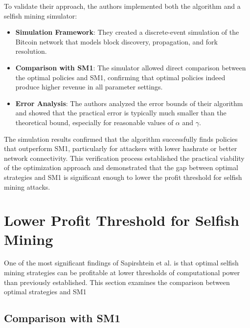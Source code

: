 \documentclass[conference]{IEEEtran}
\begin{document}
To validate their approach, the authors implemented both the algorithm and a selfish mining simulator:

\begin{itemize}
    \item \textbf{Simulation Framework}: They created a discrete-event simulation of the Bitcoin network that models block discovery, propagation, and fork resolution.
    
    
    \item \textbf{Comparison with SM1}: The simulator allowed direct comparison between the optimal policies and SM1, confirming that optimal policies indeed produce higher revenue in all parameter settings.
    
    \item \textbf{Error Analysis}: The authors analyzed the error bounds of their algorithm and showed that the practical error is typically much smaller than the theoretical bound, especially for reasonable values of $\alpha$ and $\gamma$.
\end{itemize}

The simulation results confirmed that the algorithm successfully finds policies that outperform SM1, particularly for attackers with lower hashrate or better network connectivity. This verification process established the practical viability of the optimization approach and demonstrated that the gap between optimal strategies and SM1 is significant enough to lower the profit threshold for selfish mining attacks.



\section{Lower Profit Threshold for Selfish Mining}

One of the most significant findings of Sapirshtein et al. is that optimal selfish mining strategies can be profitable at lower thresholds of computational power than previously established. This section examines the comparison between optimal strategies and SM1

\subsection{Comparison with SM1}
\end{document}
